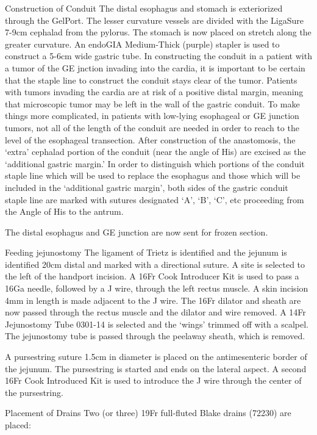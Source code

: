\documentclass[
]{book}
\begin{document}
Construction of Conduit
The distal esophagus and stomach is exteriorized through the GelPort. The lesser curvature vessels are divided with the LigaSure 7-9cm cephalad from the pylorus. The stomach is now placed on stretch along the greater curvature. An endoGIA Medium-Thick (purple) stapler is used to construct a 5-6cm wide gastric tube. In constructing the conduit in a patient with a tumor of the GE jnction invading into the cardia, it is important to be certain that the staple line to construct the conduit stays clear of the tumor. Patients with tumors invading the cardia are at risk of a positive distal margin, meaning that microscopic tumor may be left in the wall of the gastric conduit. To make things more complicated, in patients with low-lying esophageal or GE junction tumors, not all of the length of the conduit are needed in order to reach to the level of the esophageal transection. After construction of the anastomosis, the `extra' cephalad portion of the conduit (near the angle of His) are excised as the `additional gastric margin.' In order to distinguish which portions of the conduit staple line which will be used to replace the esophagus and those which will be included in the `additional gastric margin', both sides of the gastric conduit staple line are marked with sutures designated `A', `B', `C', etc proceeding from the Angle of His to the antrum.

The distal esophagus and GE junction are now sent for frozen section.

Feeding jejunostomy
The ligament of Trietz is identified and the jejunum is identified 20cm distal and marked with a directional suture. A site is selected to the left of the handport incision. A 16Fr Cook Introducer Kit is used to pass a 16Ga needle, followed by a J wire, through the left rectus muscle. A skin incision 4mm in length is made adjacent to the J wire. The 16Fr dilator and sheath are now passed through the rectus muscle and the dilator and wire removed. A 14Fr Jejunostomy Tube 0301-14 is selected and the `wings' trimmed off with a scalpel. The jejunostomy tube is passed through the peelaway sheath, which is removed.

A pursestring suture 1.5cm in diameter is placed on the antimesenteric border of the jejunum. The pursestring is started and ends on the lateral aspect. A second 16Fr Cook Introduced Kit is used to introduce the J wire through the center of the pursestring.

Placement of Drains
Two (or three) 19Fr full-fluted Blake drains (72230) are placed:
\end{document}
